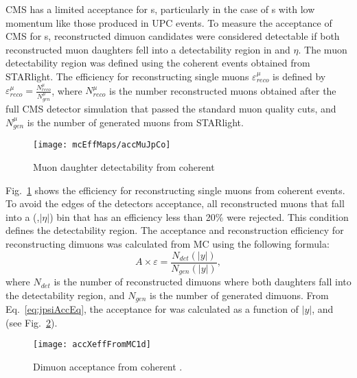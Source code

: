       CMS has a limited acceptance for \JPsi{}s, particularly in the case of 
        \JPsi{}s with low momentum like those produced in UPC events. 
      To measure the acceptance of CMS for \JPsi{}s, reconstructed dimuon 
        candidates were considered detectable if both reconstructed muon 
        daughters fell into a detectability region in \pt{} and $\eta$.
      The muon detectability region was defined using the coherent \JPsi{} 
        events obtained from STARlight.
      The efficiency for reconstructing single muons $\varepsilon^{\mu}_{reco}$ 
        is defined by $\varepsilon^{\mu}_{reco} = \frac{N^{\mu}_{reco}}{N^{\mu}_{gen}}$, 
        where $N^{\mu}_{reco}$ is the number reconstructed muons obtained 
        after the full CMS detector simulation that passed the standard
        muon quality cuts, and $N^{\mu}_{gen}$ is the number of generated 
        muons from STARlight.
      \begin{figure}[!Hhtb]
        \centering
          \texttt{[image: mcEffMaps/accMuJpCo]} 
        \caption{ Muon daughter detectability from coherent \JPsi{}}
        \label{fig:muonDaughterDet}
      \end{figure}
      Fig.~\ref{fig:muonDaughterDet} shows the efficiency for reconstructing
        single muons from coherent \JPsi{} events.
      To avoid the edges of the detectors acceptance, all reconstructed muons 
        that fall into a (\pt{},$|\eta|$) bin that has an efficiency less 
        than 20\% were rejected.
      This condition defines the detectability region.
      The acceptance and reconstruction efficiency for reconstructing dimuons 
        was calculated from MC using the following formula:
      \begin{equation}
        A \times \varepsilon=\frac{N_{det}(|y|)}{N_{gen}(|y|)},
        \label{eq:jpsiAccEq}
      \end{equation}
        where $N_{det}$ is the number of reconstructed dimuons where both 
        daughters fall into the detectability region, and $N_{gen}$ is the
        number of generated dimuons. 
      From Eq.~\ref{eq:jpsiAccEq}, the acceptance for \JPsi{} was calculated
        as a function of $|y|$, and \pt{} (see Fig.~\ref{fig:jpsiAcceptance}).
        \begin{figure}[!Hhtb]
          \centering
            \texttt{[image: accXeffFromMC1d]}
          \caption{Dimuon acceptance from coherent \JPsi{}.}
          \label{fig:jpsiAcceptance}
        \end{figure}

